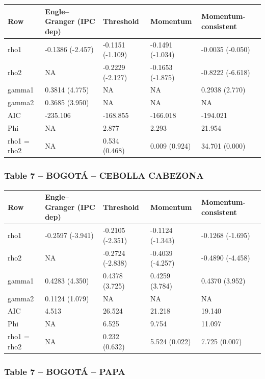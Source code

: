 \documentclass[
  12pt,
]{article}
\begin{document}
\begin{longtable}[t]{lllll}
\toprule
Row & Engle–Granger (IPC dep) & Threshold & Momentum & Momentum-consistent\\
\midrule
rho1 & -0.1386 (-2.457) & -0.1151 (-1.109) & -0.1491 (-1.034) & -0.0035 (-0.050)\\
rho2 & NA & -0.2229 (-2.127) & -0.1653 (-1.875) & -0.8222 (-6.618)\\
gamma1 & 0.3814 (4.775) & NA & NA & 0.2938 (2.770)\\
gamma2 & 0.3685 (3.950) & NA & NA & NA\\
AIC & -235.106 & -168.855 & -166.018 & -194.021\\
\addlinespace
Phi & NA & 2.877 & 2.293 & 21.954\\
rho1 = rho2 & NA & 0.534 (0.468) & 0.009 (0.924) & 34.701 (0.000)\\
\bottomrule
\end{longtable}

\subsubsection{Table 7 -- BOGOTÁ -- CEBOLLA
CABEZONA}\label{table-7-bogotuxe1-cebolla-cabezona}

\begin{longtable}[t]{lllll}
\toprule
Row & Engle–Granger (IPC dep) & Threshold & Momentum & Momentum-consistent\\
\midrule
rho1 & -0.2597 (-3.941) & -0.2105 (-2.351) & -0.1124 (-1.343) & -0.1268 (-1.695)\\
rho2 & NA & -0.2724 (-2.838) & -0.4039 (-4.257) & -0.4890 (-4.458)\\
gamma1 & 0.4283 (4.350) & 0.4378 (3.725) & 0.4259 (3.784) & 0.4370 (3.952)\\
gamma2 & 0.1124 (1.079) & NA & NA & NA\\
AIC & 4.513 & 26.524 & 21.218 & 19.140\\
\addlinespace
Phi & NA & 6.525 & 9.754 & 11.097\\
rho1 = rho2 & NA & 0.232 (0.632) & 5.524 (0.022) & 7.725 (0.007)\\
\bottomrule
\end{longtable}

\subsubsection{Table 7 -- BOGOTÁ -- PAPA}\label{table-7-bogotuxe1-papa}
\end{document}
